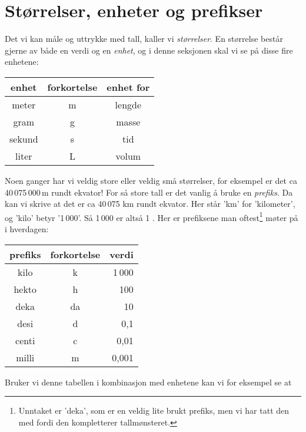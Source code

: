 





\section{Størrelser, enheter og prefikser}
Det vi kan måle og uttrykke med tall, kaller vi \textit{størrelser}. En størrelse består gjerne av både en verdi og en \textit{enhet}, og i denne seksjonen skal vi se på disse fire enhetene:
\tbs
\begin{center}
	\begin{tabular}{c|c|c}
		\textbf{enhet} & \textbf{forkortelse} &\textbf{enhet for}\\ \hline
		meter & m &lengde\\\hline
		gram & g &masse\\\hline
		sekund & s & tid\\\hline 
		liter & L & volum
	\end{tabular}
\end{center}\tbs
Noen ganger har vi veldig store eller veldig små størrelser, for eksempel er det ca 40\,075\,000\,m rundt ekvator! For så store tall er det vanlig å bruke en \textit{prefiks}. Da kan vi skrive at det er ca 40\,075 km rundt ekvator. Her står 'km' for 'kilometer', og 'kilo' betyr '1\,000'. Så 1\,000  er altså 1 . Her er prefiksene man oftest\footnote{Unntaket er 'deka', som er en veldig lite brukt prefiks, men vi har tatt den med fordi den kompletterer tallmønsteret.} møter på i hverdagen:\tbs
\begin{center}
	\begin{tabular}{c|c|r}
		\textbf{prefiks} & \textbf{forkortelse}&\textbf{verdi} \\ \hline
		kilo & k & 1\,000\phantom{000\;}\\\hline
		hekto & h & 100\phantom{000\;}\\\hline
		deka & da & 10\phantom{000\;}\\\hline
		desi & d & 0,1\phantom{0\,\;}\\\hline
		centi & c & 0,01\phantom{\,\;}\\\hline
		milli & m & 0,001\\\hline		
	\end{tabular}
\end{center}
Bruker vi denne tabellen i kombinasjon med enhetene kan vi for eksempel se at\vs
{}
